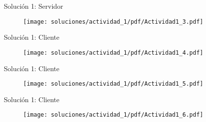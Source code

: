 \begin{frame}{Solución 1: Servidor }
\begin{figure}[H]
	\vspace{-3mm}
	\centering
	\texttt{[image: soluciones/actividad\_1/pdf/Actividad1\_3.pdf]}
\end{figure}
\end{frame}
\begin{frame}{Solución 1: Cliente }
\begin{figure}[H]
	\vspace{-3mm}
	\centering
	\texttt{[image: soluciones/actividad\_1/pdf/Actividad1\_4.pdf]}
\end{figure}
\end{frame}
\begin{frame}{Solución 1: Cliente }
\begin{figure}[H]
	\vspace{-3mm}
	\centering
	\texttt{[image: soluciones/actividad\_1/pdf/Actividad1\_5.pdf]}
\end{figure}
\end{frame}
\begin{frame}{Solución 1: Cliente }
\begin{figure}[H]
	\vspace{-3mm}
	\centering
	\texttt{[image: soluciones/actividad\_1/pdf/Actividad1\_6.pdf]}
\end{figure}
\end{frame}
